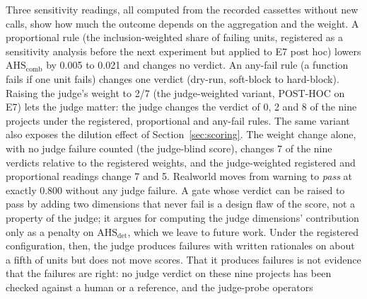 \documentclass[10pt,a4paper]{article}
\begin{document}
Three sensitivity readings, all computed from the recorded cassettes without new calls, show how much the outcome
depends on the aggregation and the weight. A proportional rule (the inclusion-weighted share of failing units,
registered as a sensitivity analysis before the next experiment but applied to E7 post hoc) lowers
$\mathrm{AHS}_\mathrm{comb}$ by 0.005 to 0.021 and changes no verdict. An any-fail rule (a function fails if one
unit fails) changes one verdict (dry-run, soft-block to hard-block). %
Raising the judge's weight to 2/7 (the judge-weighted variant, POST-HOC on E7) lets the judge matter: the judge
changes the verdict of 0, 2 and 8 of the nine projects under the registered, proportional and any-fail rules.
The same variant also exposes the dilution effect of Section~\ref{sec:scoring}. The weight change alone, with no
judge failure counted (the judge-blind score), changes 7 of the nine verdicts relative to the registered weights,
and the judge-weighted registered and proportional readings change 7 and 5. Realworld moves from warning to
\emph{pass} at exactly 0.800 without any judge failure. A gate whose verdict can be raised to pass by adding two
dimensions that never fail is a design flaw of the score, not a property of the judge; it argues for computing the
judge dimensions' contribution only as a penalty on $\mathrm{AHS}_\mathrm{det}$, which we leave to future work.
Under the registered configuration, then, the judge produces failures with written rationales on about a fifth of
units but does not move scores. That it produces failures is not evidence that the failures are right: no judge
verdict on these nine projects has been checked against a human or a reference, and the judge-probe operators
\end{document}
